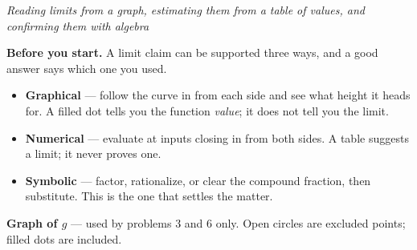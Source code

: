 \documentclass[12pt]{article}
\begin{document}

\begin{center}
\textit{Reading limits from a graph, estimating them from a table of values, and
confirming them with algebra}
\end{center}

\noindent\textbf{Before you start.} A limit claim can be supported three ways,
and a good answer says which one you used.

\begin{itemize}[leftmargin=1.2cm, itemsep=2pt, topsep=2pt]
\item \textbf{Graphical} --- follow the curve in from each side and see what
height it heads for. A filled dot tells you the function \emph{value}; it does
not tell you the limit.
\item \textbf{Numerical} --- evaluate at inputs closing in from both sides. A
table suggests a limit; it never proves one.
\item \textbf{Symbolic} --- factor, rationalize, or clear the compound
fraction, then substitute. This is the one that settles the matter.
\end{itemize}

\smallskip
\noindent\textbf{Graph of $g$} --- used by problems 3 and 6 only. Open circles
are excluded points; filled dots are included.

\begin{center}
\end{center}

\end{document}
